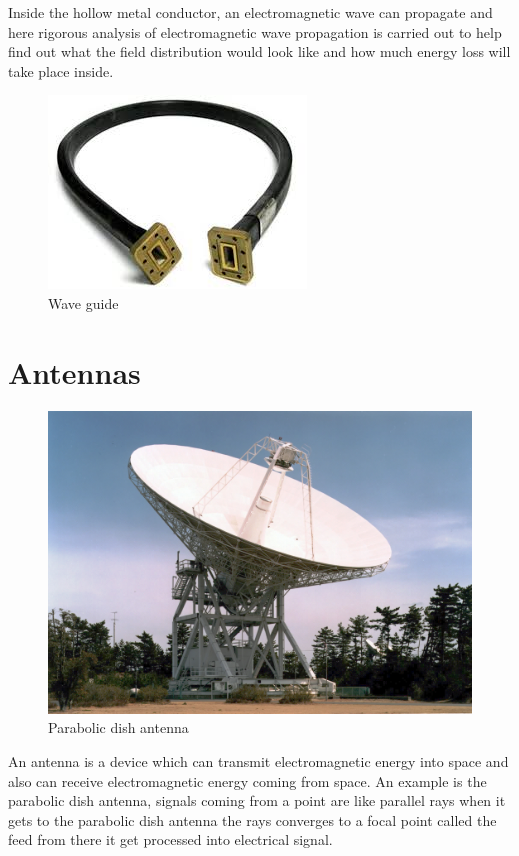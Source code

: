 Inside the hollow metal conductor, an electromagnetic wave can propagate and here rigorous analysis of electromagnetic wave propagation is carried out to help find out what the field distribution would look like and how much energy loss will take place inside.
\begin{figure}[h]
\centering
\includegraphics[scale=0.4]{./graphics/waveguide2}
\caption{Wave guide}
\end{figure}

\section{Antennas}
\begin{figure}[h]
\centering
\includegraphics[scale=0.4]{./graphics/spcaceantenna}
\caption{Parabolic dish antenna}
\end{figure}
An antenna is a device which can transmit electromagnetic energy into space and also can receive electromagnetic energy coming from space. An example is the parabolic dish antenna, signals coming from a point are like parallel rays when it gets to the parabolic dish antenna the rays converges to a focal point called the feed from there it get processed into electrical signal.\\

